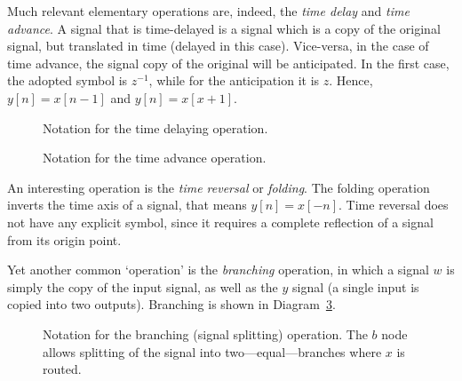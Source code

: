 \documentclass[\documentfontsize, twocolumn]{\classname}
\begin{document}
Much relevant elementary operations are, indeed, the \emph{time delay} and
\emph{time advance}. A signal that is time-delayed is a signal which is a copy
of the original signal, but translated in time (delayed in this case).
Vice-versa, in the case of time advance, the signal copy of the original will be
anticipated. In the first case, the adopted symbol is $z^{-1}$, while for the
anticipation it is $z$. Hence, $y[n] = x[n - 1]$ and $y[n] = x[x + 1]$.

\begin{figure}[ht]
\begin{center}
    \caption{Notation for the time delaying operation.}\label{tikz:delaying-operation}
\end{center}
\end{figure}

\begin{figure}[ht]
\begin{center}
    \caption{Notation for the time advance operation.}\label{tikz:advance-operation}
\end{center}
\end{figure}

An interesting operation is the \emph{time reversal} or \emph{folding}. The folding operation inverts the time axis of a signal, that means $y[n] = x[-n]$. Time reversal does not have any explicit symbol, since it requires a complete reflection of a signal from its origin point.

Yet another common `operation' is the \emph{branching} operation, in which a signal $w$ is simply the copy of the input signal, as well as the $y$ signal (a single input is copied into two outputs). Branching is shown in Diagram~\ref{tikz:branchingOperation}.
\begin{figure}[ht]
\begin{center}
    \caption{Notation for the branching (signal splitting) operation. The $b$ node allows splitting of the signal into two---equal---branches where $x$ is routed.}\label{tikz:branchingOperation}
\end{center}
\end{figure}
\end{document}
